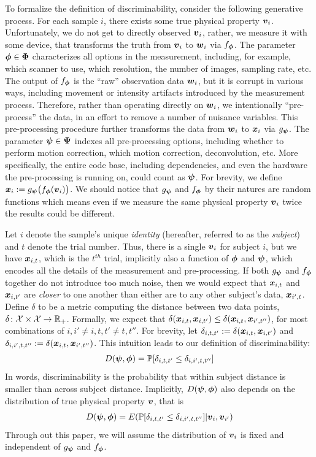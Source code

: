 \documentclass{article}
\begin{document}
To formalize the definition of discriminability, consider the following generative process. For each sample $i$, there exists some true physical property $\boldsymbol{v}_i$. Unfortunately, we do not get to directly observed $\boldsymbol{v}_i$, rather, we measure it with some device, that transforms the truth from $\boldsymbol{v}_i$ to $\boldsymbol{w}_i$ via $f_{\boldsymbol{\phi}}$. The parameter $\boldsymbol{\phi} \in \boldsymbol{\Phi}$ characterizes all options in the measurement, including, for example, which scanner to use, which resolution, the number of images, sampling rate, etc.  The output of $f_{\boldsymbol{\phi}}$ is the  ``raw'' observation data $\boldsymbol{w}_i$, but it is corrupt in various ways, including movement or intensity artifacts introduced by the measurement process.  Therefore, rather than operating directly on $\boldsymbol{w}_i$, we intentionally ``pre-process'' the data, in an effort to remove a number of nuisance variables.  This pre-processing procedure further transforms the data from $\boldsymbol{w}_i$ to $\boldsymbol{x}_i$ via $g_{\boldsymbol{\psi}}$.   The parameter $\boldsymbol{\psi} \in \boldsymbol{\Psi}$ indexes all pre-processing options, including whether to perform motion correction, which motion correction, deconvolution, etc.  More specifically, the entire code base, including dependencies, and even the hardware the pre-processing is running on, could count as $\boldsymbol{\psi}$. For brevity, we define $\boldsymbol{x}_i:= g_{\boldsymbol{\psi}} \big(f_{\boldsymbol{\phi}} (\boldsymbol{v}_i) \big)$. We should notice that $g_{\boldsymbol{\psi}}$ and $f_{\boldsymbol{\phi}}$ by their natures are random functions which means even if we measure the same physical property $\boldsymbol{v}_i$ twice the results could be different.

Let $i$ denote the sample's unique \emph{identity} (hereafter, referred to as the \emph{subject}) and $t$ denote the trial number.  Thus, there is a single $\boldsymbol{v}_i$ for subject $i$, but we have $\boldsymbol{x}_{i,t}$, which is the $t^{th}$ trial, implicitly also a function of $\boldsymbol{\phi}$ and $\boldsymbol{\psi}$, which encodes all the details of the measurement and pre-processing. If both $g_{\boldsymbol{\psi}}$ and $f_{\boldsymbol{\phi}}$ together do not introduce too much noise, then we would expect that $\boldsymbol{x}_{i,t}$ and $\boldsymbol{x}_{i,t'}$ are \emph{closer} to one another than either are to any other subject's data, $\boldsymbol{x}_{i',t}$. Define $\delta$ to be a metric computing the distance between two data points, $\delta {\ensuremath{\colon}} \mathcal{X} \times \mathcal{X} \to \mathbb{R}_+$.  Formally, we expect that $\delta(\boldsymbol{x}_{i,t},\boldsymbol{x}_{i,t'}) \leq \delta(\boldsymbol{x}_{i,t},\boldsymbol{x}_{i',t''})$, for most combinations of $i,i'\neq i,t,t' \neq t,t''$.  
For brevity, let $\delta_{i,t,t'}:=\delta(\boldsymbol{x}_{i,t}, \boldsymbol{x}_{i,t'})$ and 
$\delta_{i,i',t,t''}:=\delta(\boldsymbol{x}_{i,t}, \boldsymbol{x}_{i',t''})$.  
This intuition leads to our definition of discriminability:
\begin{align}
	D(\boldsymbol{\psi},\boldsymbol{\phi}) = \mathbb{P}[ \delta_{i,t,t'} \leq \delta_{i,i',t,t''}]
\end{align}
In words, discriminability is the probability that within subject distance is smaller than across subject distance. Implicitly, $D(\boldsymbol{\psi},\boldsymbol{\phi})$ also depends on the distribution of true physical property $\boldsymbol{v}$, that is
\begin{align}
	D(\boldsymbol{\psi},\boldsymbol{\phi}) = E(\mathbb{P} [\delta_{i,t,t'} \leq \delta_{i,i',t,t''}]|\boldsymbol{v}_i,\boldsymbol{v}_{i'})
\end{align}
Through out this paper, we will assume the distribution of $\boldsymbol{v}_i$ is fixed and independent of $g_{\boldsymbol{\psi}}$ and $f_{\boldsymbol{\phi}}$.
\end{document}

